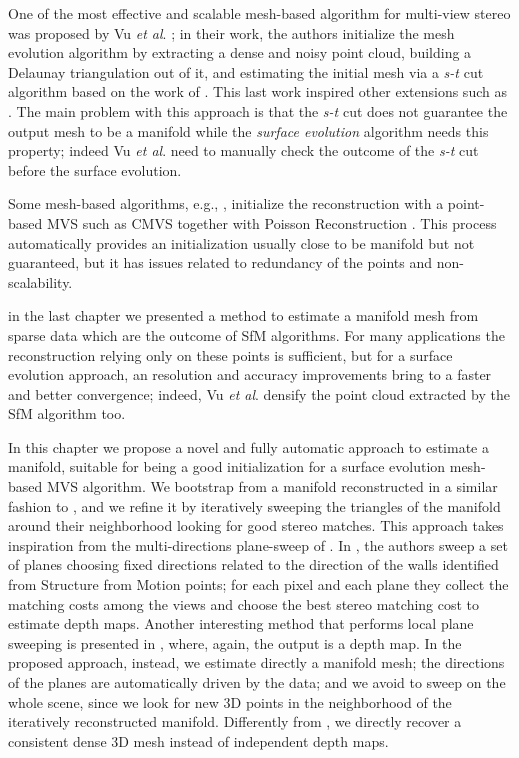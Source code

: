 One of the most effective and scalable mesh-based algorithm for multi-view stereo was proposed by Vu \emph{et al}. \cite{vu_et_al_2012}; in their work, the authors initialize the mesh evolution algorithm by extracting a dense and noisy point cloud, building a Delaunay triangulation out of it, and estimating the initial mesh via a \emph{s-t} cut algorithm based on the work of \cite{labatut2007efficient}. 
This last work inspired other extensions such as \cite{jancosek2011multi}.
The main problem with this approach is that the \emph{s-t} cut does not guarantee the output mesh to be a manifold while the \emph{surface evolution} algorithm needs this property; indeed Vu \emph{et al}.  need to manually check the outcome of the \emph{s-t} cut before the surface evolution.

Some mesh-based algorithms, e.g., \cite{pan2015automatic,li2015detail}, initialize the reconstruction with a point-based MVS such as CMVS \cite{fu10} together with Poisson Reconstruction \cite{kazhdan2006poisson}.
This process automatically provides an initialization usually close to be manifold but not guaranteed, but it has issues related to redundancy of the points and non-scalability.

in the last chapter we presented a method   to estimate a manifold mesh  from sparse data which are the outcome of SfM algorithms. 
For many applications the reconstruction relying only on these points is sufficient, but for a surface evolution approach, an resolution and accuracy improvements bring to a faster and better convergence; indeed, Vu \emph{et al}. \cite{vu_et_al_2012} densify the point cloud extracted by the SfM algorithm too.

In this chapter we propose a novel and fully automatic approach to estimate a manifold, suitable for being a good initialization for a surface evolution mesh-based MVS algorithm.
We bootstrap from a manifold reconstructed in a similar fashion to \cite{litvinov_lhuillier_13}, and we refine it by iteratively sweeping the triangles of the manifold around their neighborhood looking for good stereo matches.
This approach takes inspiration from the multi-directions plane-sweep of \cite{gallup2007real}.
In \cite{gallup2007real}, the authors sweep a set of planes choosing fixed directions related to the direction of the walls identified from Structure from Motion points; for each pixel and each plane they collect the matching costs among the views and choose the best stereo matching cost to estimate depth maps.
Another interesting method that performs local plane sweeping is presented in \cite{sinha2014efficient}, where, again, the output is a depth map.
In the proposed approach, instead, we estimate directly a manifold mesh; the directions of the planes are automatically driven by the data; and we avoid to sweep on the whole scene, since we look for new 3D points in the neighborhood of the iteratively reconstructed manifold. 
Differently from \cite{gallup2007real}, we directly recover a consistent dense 3D mesh instead of independent depth maps.

